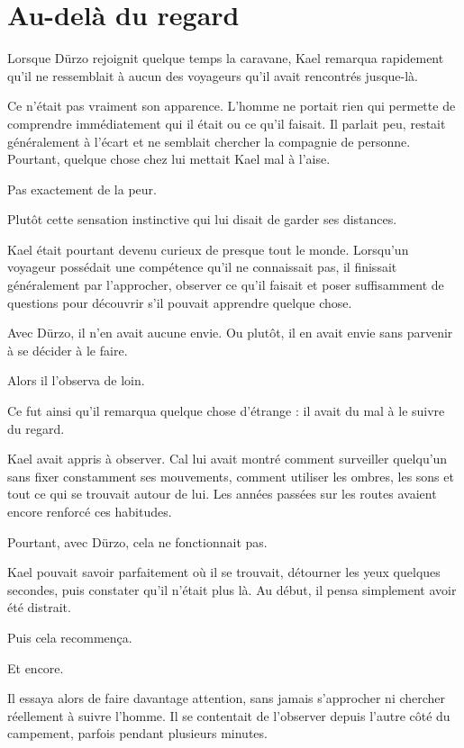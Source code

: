\chapter{Au-delà du regard}
\label{chap:au-dela-du-regard}

Lorsque Dürzo rejoignit quelque temps la caravane, Kael remarqua rapidement
qu'il ne ressemblait à aucun des voyageurs qu'il avait rencontrés jusque-là.

Ce n'était pas vraiment son apparence. L'homme ne portait rien qui permette de
comprendre immédiatement qui il était ou ce qu'il faisait. Il parlait peu,
restait généralement à l'écart et ne semblait chercher la compagnie de
personne. Pourtant, quelque chose chez lui mettait Kael mal à l'aise.

Pas exactement de la peur.

Plutôt cette sensation instinctive qui lui disait de garder ses distances.

Kael était pourtant devenu curieux de presque tout le monde. Lorsqu'un voyageur
possédait une compétence qu'il ne connaissait pas, il finissait généralement
par l'approcher, observer ce qu'il faisait et poser suffisamment de questions
pour découvrir s'il pouvait apprendre quelque chose.

Avec Dürzo, il n'en avait aucune envie. Ou plutôt, il en avait envie sans
parvenir à se décider à le faire.

Alors il l'observa de loin.

Ce fut ainsi qu'il remarqua quelque chose d'étrange : il avait du mal à le
suivre du regard.

Kael avait appris à observer. Cal lui avait montré comment surveiller quelqu'un
sans fixer constamment ses mouvements, comment utiliser les ombres, les sons et
tout ce qui se trouvait autour de lui. Les années passées sur les routes avaient
encore renforcé ces habitudes.

Pourtant, avec Dürzo, cela ne fonctionnait pas.

Kael pouvait savoir parfaitement où il se trouvait, détourner les yeux quelques
secondes, puis constater qu'il n'était plus là. Au début, il pensa simplement
avoir été distrait.

Puis cela recommença.

Et encore.

Il essaya alors de faire davantage attention, sans jamais s'approcher ni
chercher réellement à suivre l'homme. Il se contentait de l'observer depuis
l'autre côté du campement, parfois pendant plusieurs minutes.

